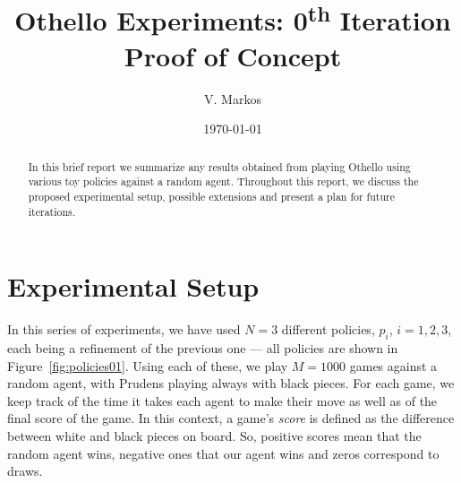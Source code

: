 \documentclass[10pt, twocolumn]{article}
\title{Othello Experiments: 0\textsuperscript{th} Iteration\\{\small Proof of Concept}}
\author{V. Markos}
\date{\today}
\begin{document}
	\maketitle
	
	\begin{abstract}
		In this brief report we summarize any results obtained from playing Othello using various toy policies against a random agent. Throughout this report, we discuss the proposed experimental setup, possible extensions and present a plan for future iterations.
	\end{abstract}
	
	\section{Experimental Setup}
	In this series of experiments, we have used $N=3$ different policies, $p_i$, $i=1,2,3$, each being a refinement of the previous one --- all policies are shown in Figure~\ref{fig:policies01}. Using each of these, we play $M=1000$ games against a random agent, with Prudens playing always with black pieces. For each game, we keep track of the time it takes each agent to make their move as well as of the final score of the game. In this context, a game's \emph{score} is defined as the difference between white and black pieces on board. So, positive scores mean that the random agent wins, negative ones that our agent wins and zeros correspond to draws.
	
\end{document}
